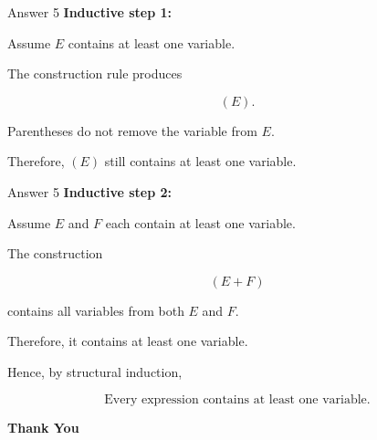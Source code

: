 \begin{frame}{Answer 5}
\textbf{Inductive step 1:}

Assume $E$ contains at least one variable.

The construction rule produces

$$
(E).
$$

Parentheses do not remove the variable from $E$.

Therefore, $(E)$ still contains at least one variable.
\end{frame}

\begin{frame}{Answer 5}
\textbf{Inductive step 2:}

Assume $E$ and $F$ each contain at least one variable.

The construction

$$
(E+F)
$$

contains all variables from both $E$ and $F$.

Therefore, it contains at least one variable.

Hence, by structural induction,

$$
\boxed{
\text{Every expression contains at least one variable.}
}
$$

\end{frame}

\begin{frame}
\centering
\vfill
{\Huge\textbf{Thank You}}
\vfill
\end{frame}
